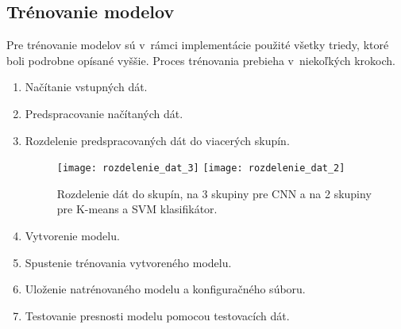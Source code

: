 \subsection{Trénovanie modelov}
\label{sec:trenovanie}
Pre trénovanie modelov sú v~rámci implementácie použité všetky triedy, ktoré boli podrobne opísané vyššie.
Proces trénovania prebieha v~niekoľkých krokoch.
\begin{enumerate}
    \item Načítanie vstupných dát.
    \item Predspracovanie načítaných dát.
    \item Rozdelenie predspracovaných dát do viacerých skupín.
    
    \begin{figure}[H]
        \centering
        \texttt{[image: rozdelenie\_dat\_3]}
        \quad
        \texttt{[image: rozdelenie\_dat\_2]}
        \caption{Rozdelenie dát do skupín, na 3 skupiny pre CNN a na 2 skupiny pre K-means a SVM klasifikátor.}
        \label{pic:datagroups}
    \end{figure}


    \item Vytvorenie modelu.
    \item Spustenie trénovania vytvoreného modelu.
    \item Uloženie natrénovaného modelu a konfiguračného súboru.
    \item Testovanie presnosti modelu pomocou testovacích dát.
\end{enumerate}

